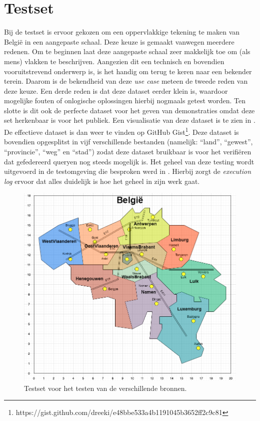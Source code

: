\section{Testset}
\label{sec:testset}
Bij de testset is ervoor gekozen om een oppervlakkige tekening te maken van België in een aangepaste schaal. Deze keuze is gemaakt vanwegen meerdere redenen. Om te beginnen laat deze aangepaste schaal zeer makkelijk toe om (als mens) vlakken te beschrijven. Aangezien dit een technisch en bovendien vooruitstrevend onderwerp is, is het handig om terug te keren naar een bekender terein. Daarom is de bekendheid van deze \textit{use case} meteen de tweede reden van deze keuze. Een derde reden is dat deze dataset eerder klein is, waardoor mogelijke fouten of onlogische oplossingen hierbij nogmaals getest worden. Ten slotte is dit ook de perfecte dataset voor het geven van demonstraties omdat deze set herkenbaar is voor het publiek. Een visualisatie van deze dataset is te zien in . De effectieve dataset is dan weer te vinden op GitHub Gist\footnote{https://gist.github.com/dreeki/e48bbe533a4b1191045b3652ff2c9c81}. Deze dataset is bovendien opgesplitst in vijf verschillende bestanden (namelijk: ``land'', ``gewest'', ``provincie'', ``weg'' en ``stad'') zodat deze dataset bruikbaar is voor het verifiëren dat gefedereerd queryen nog steeds mogelijk is. Het geheel van deze testing wordt uitgevoerd in de testomgeving die besproken werd in . Hierbij zorgt de \textit{execution log} ervoor dat alles duidelijk is hoe het geheel in zijn werk gaat.

\begin{figure}
    \centering
    \includegraphics[width=\linewidth]{images/geosparql_demo.png}
    \caption{Testset voor het testen van de verschillende bronnen.}
    \label{fig:demoset}
\end{figure}


